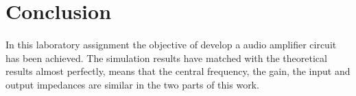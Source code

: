 \section{Conclusion}
\label{sec:conclusion}

\paragraph{} In this laboratory assignment the objective of develop a audio amplifier circuit has been
achieved. The simulation results have matched with the theoretical results almost perfectly, means that the central frequency, the gain,
the input and output impedances are similar in the two parts of this work.
